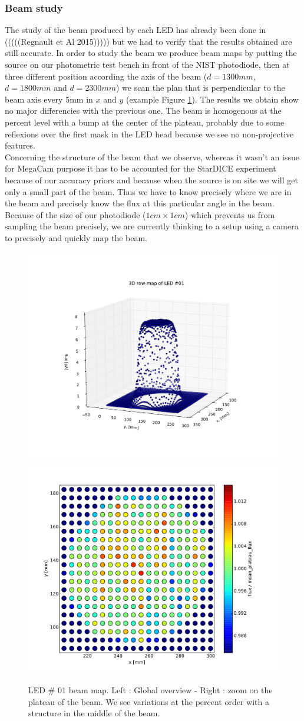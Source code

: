 \documentclass[\docopts]{\docclass}
\begin{document}
\subsubsection{Beam study}
\label{sec:beam_study}
The study of the beam produced by each LED has already been done in
(((((Regnault et Al 2015)))))\cite{2015A&A...581A..45R,} but we had to
verify that the results obtained are still accurate. In order to study
the beam we produce beam maps by putting the source on our photometric
test bench in front of the NIST photodiode, then at three different
position according the axis of the beam ($d=1300mm$, $d=1800mm $ and
$d=2300mm$) we scan the plan that is perpendicular to the beam axis
every 5mm in $x$ and $y$ (example Figure \ref{fig:beam_map}). The
results we obtain show no major differencies with the previous
one. The beam is homogenous at the percent level with a bump at the
center of the plateau, probably due to some reflexions over the first
mask in the LED head because we see
no non-projective features. \\
Concerning the structure of the beam that we observe, whereas it
wasn't an issue for MegaCam purpose it has to be accounted for the
StarDICE experiment because of our accuracy priors and because when
the source is on site we will get only a small part of the beam. Thus
we have to know precisely where we are in the beam and precisely know
the flux at this particular angle in the beam. Because of the size of
our photodiode ($1cm \times 1cm$) which prevents us from sampling the
beam precisely, we are currently thinking to a setup using a camera to
precisely and quickly map the beam.

\begin{figure}[ht]
  \centering
  \includegraphics[width=0.45\linewidth]{led-01_3d-map.pdf}
  \includegraphics[width=0.45\linewidth]{led-01_plateau-map.pdf}
  \caption{LED \# 01 beam map. Left : Global overview - Right : zoom
    on the plateau of the beam. We see variations at the percent order
    with a structure in the middle of the beam.}
  \label{fig:beam_map}
\end{figure}
\end{document}
